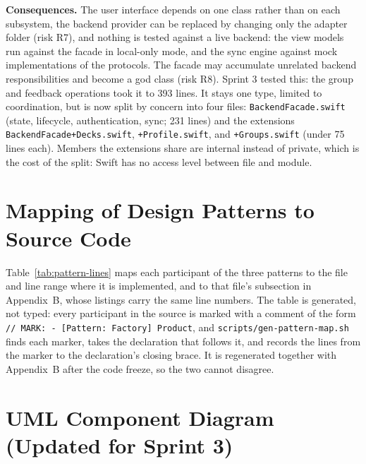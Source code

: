 \documentclass[12pt,letterpaper]{article}
\begin{document}
\textbf{Consequences.} The user interface depends on one class rather than on each
subsystem, the backend provider can be replaced by changing only the adapter folder
(risk R7), and nothing is tested against a live backend: the view models run against
the facade in local-only mode, and the sync engine against mock implementations of the
protocols. The facade may accumulate unrelated backend
responsibilities and become a god class (risk R8). Sprint 3 tested this: the group and
feedback operations took it to 393 lines. It stays one type, limited to coordination,
but is now split by concern into four files: \texttt{BackendFacade.swift} (state,
lifecycle, authentication, sync; 231 lines) and the extensions
\texttt{BackendFacade+Decks.swift}, \texttt{+Profile.swift}, and \texttt{+Groups.swift}
(under 75 lines each). Members the extensions share are internal instead of private,
which is the cost of the split: Swift has no access level between file and module.

\section{Mapping of Design Patterns to Source Code}\label{sec:patternmap}
Table~\ref{tab:pattern-lines} maps each participant of the three patterns to the file
and line range where it is implemented, and to that file's subsection in Appendix~B,
whose listings carry the same line numbers. The table is generated, not typed: every
participant in the source is marked with a comment of the form
\texttt{// MARK: - [Pattern: Factory] Product}, and \texttt{scripts/gen-pattern-map.sh}
finds each marker, takes the declaration that follows it, and records the lines from
the marker to the declaration's closing brace. It is regenerated together with
Appendix~B after the code freeze, so the two cannot disagree.

{\singlespacing\footnotesize

}

\section{UML Component Diagram (Updated for Sprint 3)}\label{sec:component}
\end{document}
